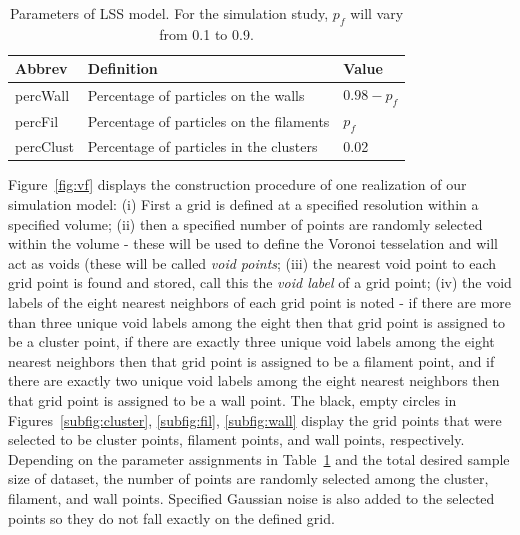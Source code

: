 \documentclass[12pt]{article}
\newcommand{\figref}[1]{Figure~\ref{#1}}
\begin{document}
\begin{table}[htp!]
\begin{center}
\begin{tabular}{ l|l|l } 
Abbrev & Definition & Value \\ 
\hline
percWall & Percentage of particles on the walls & $0.98 - p_{f}$ \\ 
percFil & Percentage of particles on the filaments & $p_{f}$ \\ 
percClust & Percentage of particles in the clusters & 0.02 \\ 
\end{tabular}
\end{center}
\caption{Parameters of LSS model. For the simulation study, $p_{f}$ will vary from 0.1 to 0.9.}
\label{table:voronoisettings}
\end{table}


\figref{fig:vf} displays the construction procedure of one realization of our simulation model:  (i) First a grid is defined at a specified resolution within a specified volume; (ii) then a specified number of points are randomly selected within the volume - these will be used to define the Voronoi tesselation and will act as voids (these will be called \emph{void points}; (iii) the nearest void point to each grid point is found and stored, call this the \emph{void label} of a grid point; (iv) the void labels of the eight nearest neighbors of each grid point is noted - if there are more than three unique void labels among the eight then that grid point is assigned to be a cluster point, if there are exactly three unique void labels among the eight nearest neighbors then that grid point is assigned to be a filament point, and if there are exactly two unique void labels among the eight nearest neighbors then that grid point is assigned to be a wall point. The black, empty circles in Figures~\ref{subfig:cluster}, \ref{subfig:fil}, \ref{subfig:wall} display the grid points that were selected to be cluster points, filament points, and wall points, respectively.  Depending on the parameter assignments in Table~\ref{table:voronoisettings} and the total desired sample size of dataset, the number of points are randomly selected among the cluster, filament, and wall points.  Specified Gaussian noise is also added to the selected points so they do not fall exactly on the defined grid.
\end{document}
